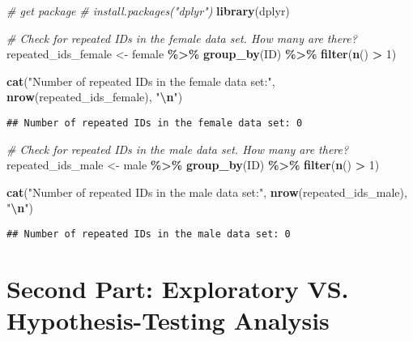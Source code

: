 \documentclass[
]{book}
\newenvironment{Shaded}{\begin{snugshade}}{\end{snugshade}}
\newcommand{\CommentTok}[1]{\textcolor[rgb]{0.56,0.35,0.01}{\textit{#1}}}
\newcommand{\DecValTok}[1]{\textcolor[rgb]{0.00,0.00,0.81}{#1}}
\newcommand{\FunctionTok}[1]{\textcolor[rgb]{0.13,0.29,0.53}{\textbf{#1}}}
\newcommand{\NormalTok}[1]{#1}
\newcommand{\OtherTok}[1]{\textcolor[rgb]{0.56,0.35,0.01}{#1}}
\newcommand{\SpecialCharTok}[1]{\textcolor[rgb]{0.81,0.36,0.00}{\textbf{#1}}}
\newcommand{\StringTok}[1]{\textcolor[rgb]{0.31,0.60,0.02}{#1}}
\begin{document}
\begin{Shaded}
\begin{Highlighting}[]
\CommentTok{\# get package}
\CommentTok{\# install.packages("dplyr")}
\FunctionTok{library}\NormalTok{(dplyr)}


\CommentTok{\# Check for repeated IDs in the female data set. How many are there?}
\NormalTok{repeated\_ids\_female }\OtherTok{\textless{}{-}}\NormalTok{ female }\SpecialCharTok{\%\textgreater{}\%}
  \FunctionTok{group\_by}\NormalTok{(ID) }\SpecialCharTok{\%\textgreater{}\%}
  \FunctionTok{filter}\NormalTok{(}\FunctionTok{n}\NormalTok{() }\SpecialCharTok{\textgreater{}} \DecValTok{1}\NormalTok{)}

\FunctionTok{cat}\NormalTok{(}\StringTok{"Number of repeated IDs in the female data set:"}\NormalTok{, }\FunctionTok{nrow}\NormalTok{(repeated\_ids\_female), }\StringTok{"}\SpecialCharTok{\textbackslash{}n}\StringTok{"}\NormalTok{)}
\end{Highlighting}
\end{Shaded}

\begin{verbatim}
## Number of repeated IDs in the female data set: 0
\end{verbatim}

\begin{Shaded}
\begin{Highlighting}[]
\CommentTok{\# Check for repeated IDs in the male data set. How many are there?}
\NormalTok{repeated\_ids\_male }\OtherTok{\textless{}{-}}\NormalTok{ male }\SpecialCharTok{\%\textgreater{}\%}
  \FunctionTok{group\_by}\NormalTok{(ID) }\SpecialCharTok{\%\textgreater{}\%}
  \FunctionTok{filter}\NormalTok{(}\FunctionTok{n}\NormalTok{() }\SpecialCharTok{\textgreater{}} \DecValTok{1}\NormalTok{)}

\FunctionTok{cat}\NormalTok{(}\StringTok{"Number of repeated IDs in the male data set:"}\NormalTok{, }\FunctionTok{nrow}\NormalTok{(repeated\_ids\_male), }\StringTok{"}\SpecialCharTok{\textbackslash{}n}\StringTok{"}\NormalTok{)}
\end{Highlighting}
\end{Shaded}

\begin{verbatim}
## Number of repeated IDs in the male data set: 0
\end{verbatim}

\hypertarget{second-part-exploratory-vs.-hypothesis-testing-analysis}{%
\section{Second Part: Exploratory VS. Hypothesis-Testing Analysis}\label{second-part-exploratory-vs.-hypothesis-testing-analysis}}
\end{document}
